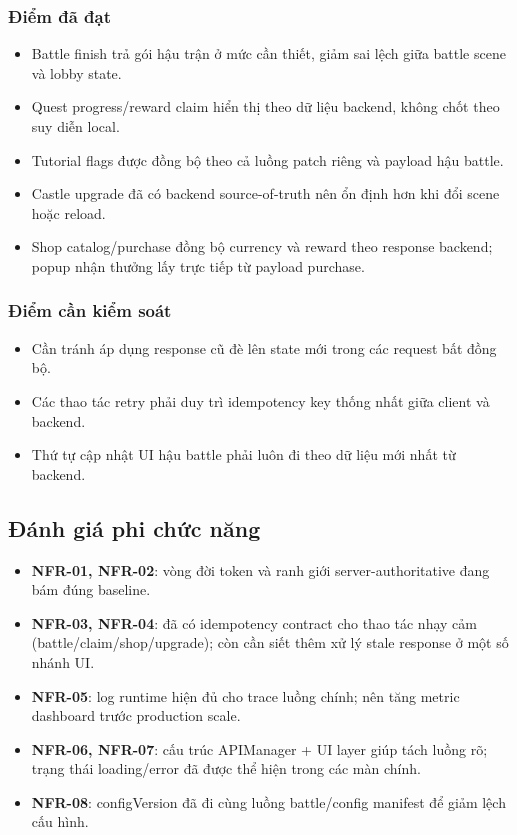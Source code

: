 \subsubsection{Điểm đã đạt}
\begin{itemize}
    \item Battle finish trả gói hậu trận ở mức cần thiết, giảm sai lệch giữa battle scene và lobby state.
    \item Quest progress/reward claim hiển thị theo dữ liệu backend, không chốt theo suy diễn local.
    \item Tutorial flags được đồng bộ theo cả luồng patch riêng và payload hậu battle.
    \item Castle upgrade đã có backend source-of-truth nên ổn định hơn khi đổi scene hoặc reload.
    \item Shop catalog/purchase đồng bộ currency và reward theo response backend; popup nhận thưởng lấy trực tiếp từ payload purchase.
\end{itemize}

\subsubsection{Điểm cần kiểm soát}
\begin{itemize}
    \item Cần tránh áp dụng response cũ đè lên state mới trong các request bất đồng bộ.
    \item Các thao tác retry phải duy trì idempotency key thống nhất giữa client và backend.
    \item Thứ tự cập nhật UI hậu battle phải luôn đi theo dữ liệu mới nhất từ backend.
\end{itemize}

\subsection{Đánh giá phi chức năng}
\label{subsec:eval-nfr}

\begin{itemize}
    \item \textbf{NFR-01, NFR-02}: vòng đời token và ranh giới server-authoritative đang bám đúng baseline.
    \item \textbf{NFR-03, NFR-04}: đã có idempotency contract cho thao tác nhạy cảm
    (battle/\allowbreak claim/\allowbreak shop/\allowbreak upgrade); còn cần siết thêm xử lý stale response ở một số nhánh UI.
    \item \textbf{NFR-05}: log runtime hiện đủ cho trace luồng chính; nên tăng metric dashboard trước production scale.
    \item \textbf{NFR-06, NFR-07}: cấu trúc APIManager + UI layer giúp tách luồng rõ; trạng thái loading/error đã được thể hiện trong các màn chính.
    \item \textbf{NFR-08}: configVersion đã đi cùng luồng battle/config manifest để giảm lệch cấu hình.
\end{itemize}

